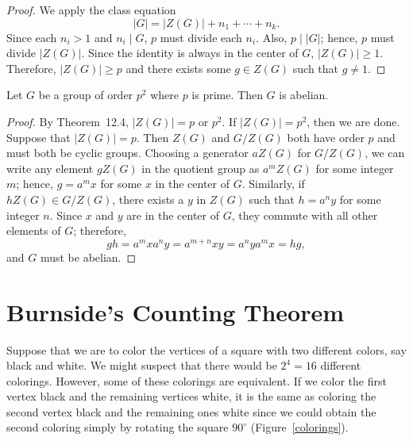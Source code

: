  
\begin{proof}
We apply the class equation
$$
|G| = |Z(G)|  + n_1 + \cdots + n_k.
$$
Since each $n_i>1$ and $n_i \mid G$, $p$  must divide each $n_i$.
Also, $p \mid |G|$; hence, $p$ must divide $|Z(G)|$. Since the
identity is always in the center of $G$, $|Z(G)| \geq 1$. Therefore,
$|Z(G)|  \geq p$ and there exists some $g \in Z(G)$ such that $g \neq
1$. 
\mbox{\hspace*{1in}} 
\end{proof}
 
 
\begin{corollary}
Let $G$ be a group of order $p^2$ where $p$ is prime. Then $G$ is
abelian. 
\end{corollary}
 
 
\begin{proof}
By Theorem~12.4, $|Z(G)| = p$ or $p^2$.  If $|Z(G)| = p^2$, then
we are done.  Suppose that $|Z(G)| = p$. Then $Z(G)$ and $G / Z(G)$
both have order $p$ and must both be cyclic groups.  Choosing  a
generator $aZ(G)$ for $G / Z(G)$, we can write any element $gZ(G)$ in
the quotient group as $a^m Z(G)$ for some integer $m$; hence, $g = a^m
x$ for some $x$ in the center of $G$.  Similarly, if $hZ(G) \in G /
Z(G)$, there exists a $y$ in $Z(G)$ such that $h = a^n y$ for some
integer $n$.  Since $x$ and $y$ are in the center of $G$, they commute
with all other elements of $G$; therefore, 
$$
gh  =  a^m x a^n y =  a^{m+n} x y = a^n y a^m x = hg,
$$
and $G$ must be abelian.
\end{proof}
 
 
 
\section{Burnside's Counting Theorem}
 
 
 
Suppose that we are to color the vertices of a square with two
different colors, say black and white.  We might suspect that there
would be $2^4=16$ different colorings. However, some of these
colorings are equivalent.  If we color the first vertex black and the
remaining vertices white, it is the same as coloring the second vertex
black and the remaining ones white since we could obtain the second
coloring simply by rotating the square $90^\circ$
(Figure~\ref{colorings}). 
 
